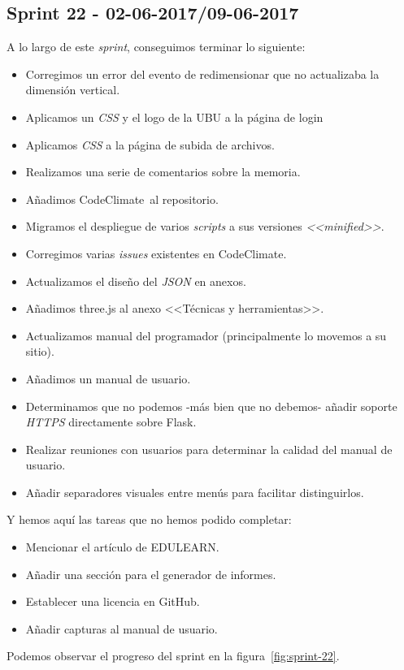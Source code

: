 \subsection{Sprint 22 - 02-06-2017/09-06-2017}
A lo largo de este \textit{sprint}, conseguimos terminar lo siguiente:
\begin{itemize}
	\item Corregimos un error del evento de redimensionar que no actualizaba la dimensión vertical.
	\item Aplicamos un \textit{CSS} y el logo de la UBU a la página de login
	\item Aplicamos \textit{CSS} a la página de subida de archivos.
	\item Realizamos una serie de comentarios sobre la memoria.
	\item Añadimos CodeClimate al repositorio.
	\item Migramos el despliegue de varios \textit{scripts} a sus versiones \textit{<<minified>>}.
	\item Corregimos varias \textit{issues} existentes en CodeClimate.
	\item Actualizamos el diseño del \textit{JSON} en anexos.
	\item Añadimos three.js al anexo <<Técnicas y herramientas>>.
	\item Actualizamos manual del programador (principalmente lo movemos a su sitio).
	\item Añadimos un manual de usuario.
	\item Determinamos que no podemos -más bien que no debemos- añadir soporte \textit{HTTPS} directamente sobre Flask.
	\item Realizar reuniones con usuarios para determinar la calidad del manual de usuario.
	\item Añadir separadores visuales entre menús para facilitar distinguirlos.
\end{itemize}

Y hemos aquí las tareas que no hemos podido completar:
\begin{itemize}
	\item Mencionar el artículo de EDULEARN.
	\item Añadir una sección para el generador de informes.
	\item Establecer una licencia en GitHub.
	\item Añadir capturas al manual de usuario.
\end{itemize}

Podemos observar el progreso del sprint en la figura~\ref{fig:sprint-22}.

